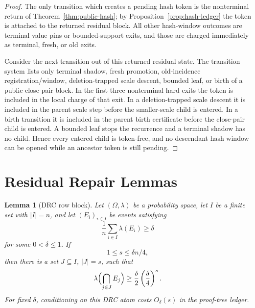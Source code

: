 \documentclass[11pt]{article}
\newtheorem{lemma}[theorem]{Lemma}
\begin{document}
\begin{proof}
The only transition which creates a pending hash token is the nonterminal
return of Theorem~\ref{thm:public-hash}; by Proposition~\ref{prop:hash-ledger}
the token is attached to the returned residual block.  All other hash-window
outcomes are terminal value pins or bounded-support exits, and those are
charged immediately as terminal, fresh, or old exits.

Consider the next transition out of this returned residual state.  The
transition system lists only terminal shadow, fresh promotion, old-incidence
registration/window, deletion-trapped scale descent, bounded leaf, or birth of
a public close-pair block.  In the first three nonterminal hard exits the token
is included in the local charge of that exit.  In a deletion-trapped scale
descent it is included in the parent scale step before the smaller-scale child
is entered.  In a birth transition it is included in the parent birth
certificate before the close-pair child is entered.  A bounded leaf stops the
recurrence and a terminal shadow has no child.  Hence every entered child is
token-free, and no descendant hash window can be opened while an ancestor token
is still pending.
\end{proof}

\section{Residual Repair Lemmas}
\label{sec:residual-repair}

\begin{lemma}[DRC row block]
\label{lem:drc-row-block}
Let $(\Omega,\lambda)$ be a probability space, let $I$ be a finite set with
$|I|=n$, and let $(E_i)_{i\in I}$ be events satisfying
\[
  \frac1n\sum_{i\in I}\lambda(E_i)\ge \delta
\]
for some $0<\delta\le 1$.  If
\[
  1\le s\le \delta n/4,
\]
then there is a set $J\subseteq I$, $|J|=s$, such that
\[
  \lambda\Bigl(\bigcap_{j\in J}E_j\Bigr)
  \ge
  \frac{\delta}{2}\left(\frac{\delta}{4}\right)^s.
\]
For fixed $\delta$, conditioning on this DRC atom costs $O_\delta(s)$ in the
proof-tree ledger.
\end{lemma}
\end{document}
